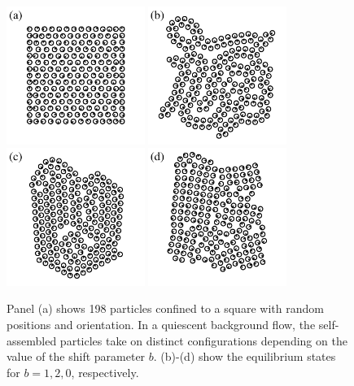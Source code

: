 \documentclass[aps,prl,preprint,groupedaddress]{revtex4-2}
\begin{document}
\begin{figure}
\begin{center}
  \includegraphics[width=0.4\textwidth]{Nb198a.pdf}
  \includegraphics[width=0.4\textwidth]{Nb198b.pdf}\\
  \includegraphics[width=0.4\textwidth]{Nb198c.pdf}
  \includegraphics[width=0.4\textwidth]{Nb198d.pdf}
\end{center}
\begin{caption}{\label{fig:relax}
  Panel (a) shows 198 particles confined to a square with random 
  positions and orientation.
  In a quiescent background flow, 
  the self-assembled particles take on distinct configurations
  depending on the value of the shift parameter $b$. (b)-(d) show the equilibrium states for $b=1, 2, 0$, respectively.}
\end{caption}
\end{figure}
\end{document}
